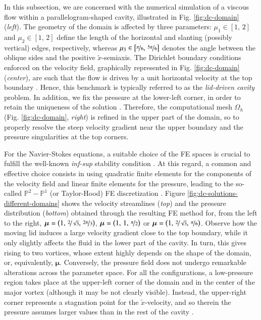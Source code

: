 \documentclass{elsarticle}
\numberwithin{equation}{section}
\theoremstyle{theorem}
\theoremstyle{definition}
\theoremstyle{remark}
\theoremstyle{proposition}
\numberwithin{figure}{section}
\newcommand{\wt}[1]{\widetilde{#1}}
\newcommand{\bg}[1]{\boldsymbol{#1}}
\begin{document}
		In this subsection, we are concerned with the numerical simulation of a viscous flow within a parallelogram-shaped cavity, illustrated in Fig. \ref{fig:dc-domain} (\emph{left}). The geometry of the domain is affected by three parameters: $\mu_1 \in [1, \, 2]$ and $\mu_2 \in [1, \, 2]$ define the length of the horizontal and slanting (possibly vertical) edges, respectively, whereas $\mu_3 \in \big[ \nicefrac{\pi}{6}, \, \nicefrac{5 \pi}{6} \big]$ denotes the angle between the oblique sides and the positive $\wt{x}$-semiaxis. The Dirichlet boundary conditions enforced on the velocity field, graphically represented in Fig. \ref{fig:dc-domain} (\emph{center}), are such that the flow is driven by a unit horizontal velocity at the top boundary \cite{Per02}. Hence, this benchmark is typically referred to as the \emph{lid-driven cavity} problem. In addition, we fix the pressure at the lower-left corner, in order to retain the uniqueness of the solution \cite{Dho14}. Therefore, the computational mesh $\Omega_h$ (Fig. \ref{fig:dc-domain}, \emph{right}) is refined in the upper part of the domain, so to properly resolve the steep velocity gradient near the upper boundary and the pressure singularities at the top corners. %
		
		For the Navier-Stokes equations, a suitable choice of the FE spaces is crucial to fulfill the well-known \emph{inf-sup} stability condition \cite{Ran99}. At this regard, a common and effective choice consists in using quadratic finite elements for the components of the velocity field and linear finite elements for the pressure, leading to the so-called $\mathbb{P}^2 - \mathbb{P}^1$ (or Taylor-Hood) FE discretization \cite{Per02}. Figure \ref{fig:dc-solutions-different-domains} shows the velocity streamlines (\emph{top}) and the pressure distribution (\emph{bottom}) obtained through the resulting FE method for, from the left to the right, $\bg{\mu} = \big( 1, \, \nicefrac{2}{\sqrt{3}}, \, \nicefrac{2 \pi}{3} \big)$, $\bg{\mu} = \big( 1, \, 1, \, \nicefrac{\pi}{2} \big)$ or $\bg{\mu} = \big( 1, \, \nicefrac{2}{\sqrt{3}}, \, \nicefrac{\pi}{6} \big)$. Observe how the moving lid induces a large velocity gradient close to the top boundary, while it only slightly affects the fluid in the lower part of the cavity. In turn, this gives rising to two vortices, whose extent highly depends on the shape of the domain, or, equivalently, $\bg{\mu}$. Conversely, the pressure field does not undergo remarkable alterations across the parameter space. For all the configurations, a low-pressure region takes place at the upper-left corner of the domain and in the center of the major vortex (although it may be not clearly visible). Instead, the upper-right corner represents a stagnation point for the $\wt{x}$-velocity, and so therein the pressure assumes larger values than in the rest of the cavity \cite{Dho14}.
		
\end{document}
